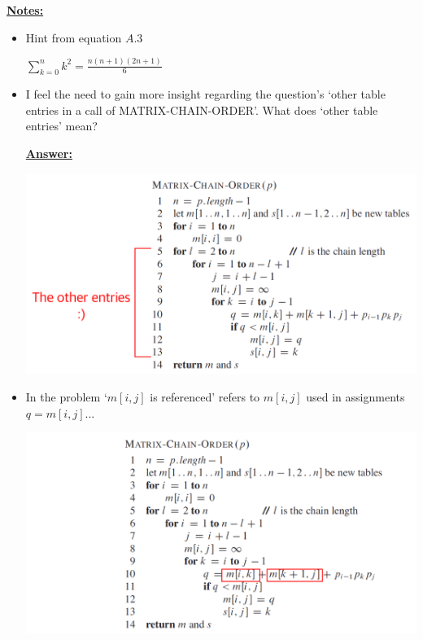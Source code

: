 \documentclass[12pt]{article}
\begin{document}
\begin{enumerate}[1.]


    \bigskip

    \underline{\textbf{Notes:}}

    \bigskip

    \begin{itemize}
        \item Hint from equation $A.3$

        \bigskip

        $\sum\limits_{k=0}^n k^2 = \frac{n(n+1)(2n+1)}{6}$

        \item I feel the need to gain more insight regarding the question's `other table
        entries in a call of MATRIX-CHAIN-ORDER'. What does `other table entries' mean?

        \bigskip

        \underline{\textbf{Answer:}}

        \begin{center}
        \includegraphics[width=\linewidth]{images/worksheet_3_solution_6.png}
        \end{center}

        \item In the problem `$m[i,j]$ is referenced' refers to $m[i,j]$ used in assignments $q = m[i,j] ...$

        \begin{center}
        \includegraphics[width=\linewidth]{images/worksheet_3_solution_7.png}
        \end{center}
    \end{itemize}


\end{enumerate}
\end{document}
